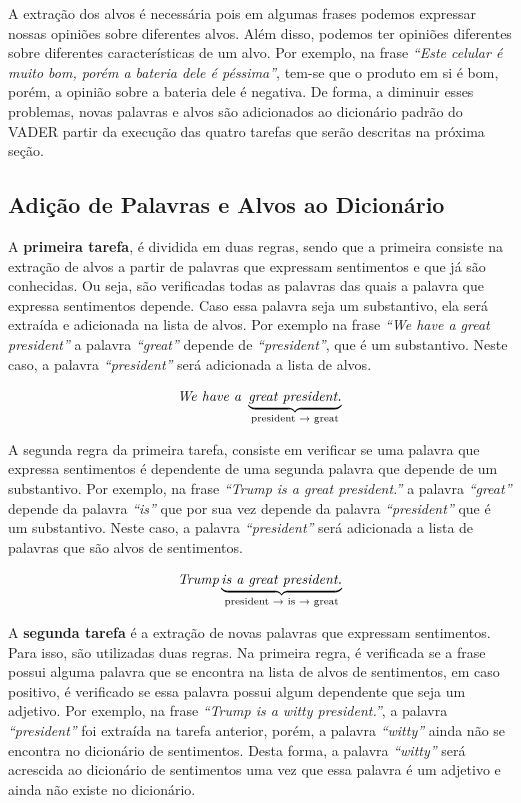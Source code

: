 A extração dos alvos é necessária pois em algumas frases
podemos expressar nossas opiniões sobre diferentes alvos. Além disso, podemos
ter opiniões diferentes sobre diferentes características de um alvo. Por
exemplo, na frase \textit{``Este celular é muito bom, porém a bateria dele é
péssima''}, tem-se que o produto em si é bom, porém, a opinião sobre a bateria
dele é negativa. De forma, a diminuir esses problemas, novas palavras e alvos
são adicionados ao dicionário padrão do \ac{VADER} partir da execução das quatro
tarefas que serão descritas na próxima seção.

\subsection{Adição de Palavras e Alvos ao Dicionário}

A \textbf{primeira tarefa}, é dividida em duas regras, sendo que a primeira
consiste na extração de alvos a partir de palavras que expressam sentimentos e
que já são conhecidas. Ou seja, são verificadas todas as palavras das quais a palavra que
expressa sentimentos depende. Caso essa palavra seja um substantivo, ela será
extraída e adicionada na lista de alvos. Por exemplo na frase \textit{``We have a great president''} a palavra \textit{``great''} depende de \textit{``president''}, que é um substantivo. Neste caso, a palavra \textit{``president''} será adicionada a
lista de alvos.

\[\textit{We have a } \underbrace{\textit{great president.}}_\text{president
\textrightarrow \text{ great}}\]

A segunda regra da primeira tarefa,
consiste em verificar se uma palavra que expressa sentimentos é dependente de
uma segunda palavra que depende de um substantivo.
Por exemplo, na frase \textit{``Trump is a great president.''} a palavra
\textit{``great''} depende da palavra \textit{``is''} que por sua vez depende da
palavra \textit{``president''} que é um substantivo. Neste caso, a palavra
\textit{``president''} será adicionada a lista de palavras que são alvos de sentimentos.

\[\textit{Trump} \underbrace{\textit{is a great president.}}_\text{president
\textrightarrow \text{ is} \textrightarrow \text{ great}}\]

A \textbf{segunda tarefa} é a extração de novas palavras que expressam
sentimentos. Para isso, são utilizadas duas regras. Na primeira regra, é
verificada se a frase possui alguma palavra que se encontra na lista de alvos de
sentimentos, em caso positivo, é verificado se essa palavra possui algum dependente que seja um adjetivo. Por exemplo, na frase \textit{``Trump is a witty president.''}, a palavra \textit{``president''} foi
extraída na tarefa anterior, porém, a palavra \textit{``witty''} ainda não se
encontra no dicionário de sentimentos.
Desta forma, a palavra \textit{``witty''} será acrescida ao
dicionário de sentimentos uma vez que essa palavra é um adjetivo e ainda não
existe no dicionário.


